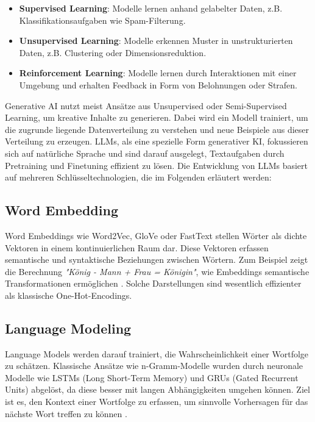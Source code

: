 \documentclass[12pt]{article}
\begin{document}
\begin{itemize}
    \item \textbf{Supervised Learning}: Modelle lernen anhand gelabelter Daten, z.B. Klassifikationsaufgaben wie Spam-Filterung.
    \item \textbf{Unsupervised Learning}: Modelle erkennen Muster in unstrukturierten Daten, z.B. Clustering oder Dimensionsreduktion.
    \item \textbf{Reinforcement Learning}: Modelle lernen durch Interaktionen mit einer Umgebung und erhalten Feedback in Form von Belohnungen oder Strafen.
\end{itemize}

Generative AI nutzt meist Ansätze aus Unsupervised oder Semi-Supervised Learning, um kreative Inhalte zu generieren. Dabei wird ein Modell trainiert, um die zugrunde liegende Datenverteilung zu verstehen und neue Beispiele aus dieser Verteilung zu erzeugen. LLMs, als eine spezielle Form generativer KI, fokussieren sich auf natürliche Sprache und sind darauf ausgelegt, Textaufgaben durch Pretraining und Finetuning effizient zu lösen. Die Entwicklung von LLMs basiert auf mehreren Schlüsseltechnologien, die im Folgenden erläutert werden:\\

\subsection{Word Embedding}

Word Embeddings wie Word2Vec, GloVe oder FastText stellen Wörter als dichte Vektoren in einem kontinuierlichen Raum dar. Diese Vektoren erfassen semantische und syntaktische Beziehungen zwischen Wörtern. Zum Beispiel zeigt die Berechnung \emph{"König - Mann + Frau = Königin"}, wie Embeddings semantische Transformationen ermöglichen \cite{mikolov2013}. Solche Darstellungen sind wesentlich effizienter als klassische One-Hot-Encodings.


\subsection{Language Modeling}

Language Models werden darauf trainiert, die Wahrscheinlichkeit einer Wortfolge zu schätzen. Klassische Ansätze wie n-Gramm-Modelle wurden durch neuronale Modelle wie LSTMs (Long Short-Term Memory) und GRUs (Gated Recurrent Units) abgelöst, da diese besser mit langen Abhängigkeiten umgehen können. Ziel ist es, den Kontext einer Wortfolge zu erfassen, um sinnvolle Vorhersagen für das nächste Wort treffen zu können \cite{brown2020}.
\end{document}

